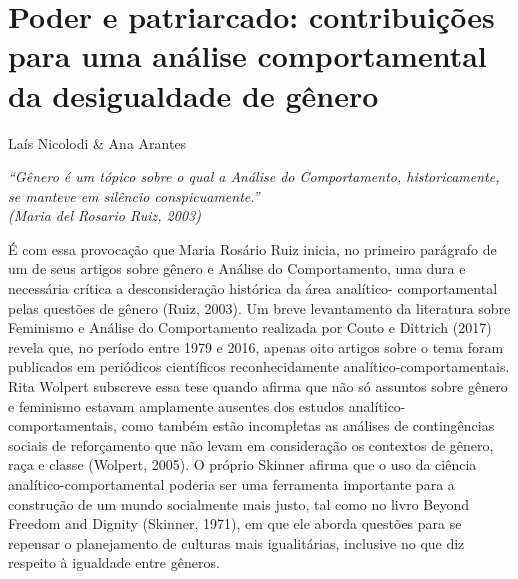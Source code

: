 \chapter{Poder e patriarcado: contribuições para uma análise comportamental da desigualdade de gênero}
\begin{flushright}
\begin{small}
Laís Nicolodi \& Ana Arantes
\end{small}
\vspace{1cm}

\emph{``Gênero é um tópico sobre o qual a Análise do Comportamento, historicamente, se manteve em silêncio conspicuamente.''\\ (Maria del Rosario Ruiz, 2003)}
\end{flushright}

É com essa provocação que Maria Rosário Ruiz inicia, no primeiro parágrafo de um de seus artigos sobre gênero e Análise do Comportamento, uma dura e necessária crítica a desconsideração histórica da área analítico- comportamental pelas questões de gênero (Ruiz, 2003). Um breve levantamento da literatura sobre Feminismo e Análise do Comportamento realizada por Couto e Dittrich (2017) revela que, no período entre 1979 e 2016, apenas oito artigos sobre o tema foram publicados em periódicos científicos reconhecidamente analítico-comportamentais. Rita Wolpert subscreve essa tese quando afirma que não só assuntos sobre gênero e feminismo estavam amplamente ausentes dos estudos analítico-comportamentais, como também estão incompletas as análises de contingências sociais de reforçamento que não levam em consideração os contextos de gênero, raça e classe (Wolpert, 2005). O próprio Skinner afirma que o uso da ciência analítico-comportamental poderia ser uma ferramenta importante para a construção de um mundo socialmente mais justo, tal como no livro Beyond Freedom and Dignity (Skinner, 1971), em que ele aborda questões para se repensar o planejamento de culturas mais igualitárias, inclusive no que diz respeito à igualdade entre gêneros.

